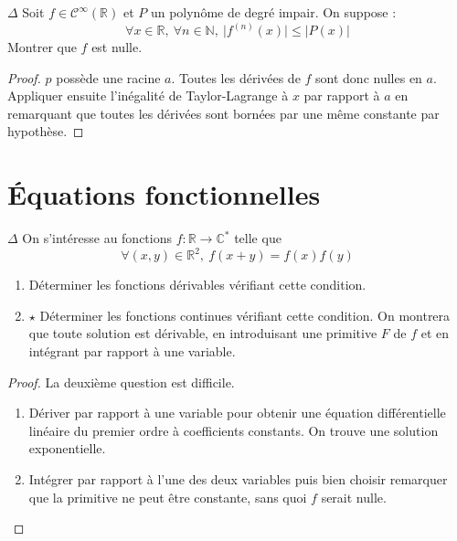 \documentclass[french,a4paper]{article}
\newcommand{\N}{\mathbb{N}}
\newcommand{\R}{\mathbb{R}}
\newcommand{\C}{\mathbb{C}}
\newcommand{\st}{^*}
\theoremstyle{plain}
\theoremstyle{definition}
\theoremstyle{remark}
\begin{document}
\begin{ex}[Moulin.FV.31]{$\Delta$}
	Soit $f\in\mathcal{C}^\infty(\R)$ et $P$ un polynôme de degré impair. On suppose : $$\forall x\in\R,\ \forall n\in\N,\ \lvert f^{(n)}(x)\rvert\leqslant\lvert P(x)\rvert$$ Montrer que $f$ est nulle.
\end{ex}
\begin{proof}
	$p$ possède une racine $a$. Toutes les dérivées de $f$ sont donc nulles en $a$. Appliquer ensuite l'inégalité de Taylor-Lagrange à $x$ par rapport à $a$ en remarquant que toutes les dérivées sont bornées par une même constante par hypothèse.
\end{proof}

\section{Équations fonctionnelles}
\begin{ex}[Moulin.FV.32]{$\Delta$}
	On s'intéresse au fonctions $f:\R\to\C\st$ telle que $$\forall (x,y)\in\R^2,\ f(x+y)=f(x)f(y)$$
	\begin{enumerate}
		\item Déterminer les fonctions dérivables vérifiant cette condition.
		\item $\star$ Déterminer les fonctions continues vérifiant cette condition. On montrera que toute solution est dérivable, en introduisant une primitive $F$ de $f$ et en intégrant par rapport à une variable.
	\end{enumerate}
\end{ex}
\begin{proof}
	La deuxième question est difficile.
	\begin{enumerate}
		\item Dériver par rapport à une variable pour obtenir une équation différentielle linéaire du premier ordre à coefficients constants. On trouve une solution exponentielle.
		\item Intégrer par rapport à l'une des deux variables puis bien choisir remarquer que la primitive ne peut être constante, sans quoi $f$ serait nulle.
	\end{enumerate}
\end{proof}
\end{document}
